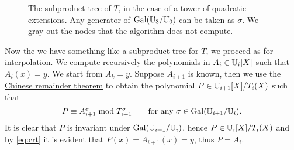 \begin{figure}[tb]
  \centering
  
  \hfill
  
  \caption{The subproduct tree of $T$, in the case of a tower of
    quadratic extensions. Any generator of $\operatorname{Gal}(\mathbb{U}_3/\mathbb{U}_0)$ can be
    taken as $\sigma$. We gray out the nodes that the algorithm does
    not compute.}
  \label{fig:tree}
\end{figure}


Now the we have something like a subproduct tree for $T$, we proceed
as for interpolation. We compute recursively the polynomials in
$A_i\in\mathbb{U}_i[X]$ such that $A_i(x)=y$. We start from $A_k=y$. Suppose
$A_{i+1}$ is known, then we use the
\hyperref[th:chinese-remainder]{Chinese remainder theorem} to obtain
the polynomial $P\in\mathbb{U}_{i+1}[X]/T_i(X)$ such that
\begin{equation}
  \label{eq:crt}
  P \equiv A_{i+1}^\sigma \bmod T_{i+1}^\sigma
  \qquad\text{for any $\sigma\in\operatorname{Gal}(\mathbb{U}_{i+1}/\mathbb{U}_i)$.}
\end{equation}
It is clear that $P$ is invariant under $\operatorname{Gal}(\mathbb{U}_{i+1}/\mathbb{U}_i)$, hence
$P\in\mathbb{U}_i[X]/T_i(X)$ and by \eqref{eq:crt} it is evident that
$P(x)=A_{i+1}(x)=y$, thus $P=A_i$.

